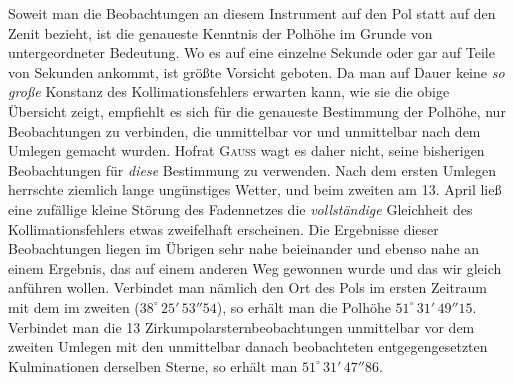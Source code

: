\par\indent Soweit man die Beobachtungen an diesem Instrument auf den Pol statt auf den Zenit bezieht, ist die genaueste Kenntnis der Polhöhe im Grunde von untergeordneter Bedeutung. Wo es auf eine einzelne Sekunde oder gar auf Teile von Sekunden ankommt, ist größte Vorsicht geboten. Da man auf Dauer keine \textit{so große} Konstanz des Kollimationsfehlers erwarten kann, wie sie die obige Übersicht zeigt, empfiehlt es sich für die genaueste Bestimmung der Polhöhe, nur Beobachtungen zu verbinden, die unmittelbar vor und unmittelbar nach dem Umlegen gemacht wurden. Hofrat \textsc{Gauss} wagt es daher nicht, seine bisherigen Beobachtungen für \textit{diese} Bestimmung zu verwenden. Nach dem ersten Umlegen herrschte ziemlich lange ungünstiges Wetter, und beim zweiten am 13. April ließ eine zufällige kleine Störung des Fadennetzes die \textit{vollständige} Gleichheit des Kollimationsfehlers etwas zweifelhaft erscheinen. Die Ergebnisse dieser Beobachtungen liegen im Übrigen sehr nahe beieinander und ebenso nahe an einem Ergebnis, das auf einem anderen Weg gewonnen wurde und das wir gleich anführen wollen. Verbindet man nämlich den Ort des Pols im ersten Zeitraum mit dem im zweiten ($38^\circ\,25'\,53''\!54$), so erhält man die Polhöhe $51^\circ\,31'\,49''\!15$. Verbindet man die 13 Zirkumpolarsternbeobachtungen unmittelbar vor dem zweiten Umlegen mit den unmittelbar danach beobachteten entgegengesetzten Kulminationen derselben Sterne, so erhält man $51^\circ\,31'\,47''\!86$.

